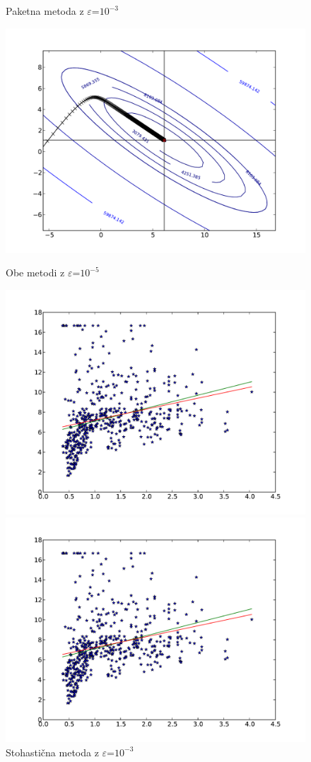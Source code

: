 \documentclass[a4paper,11pt]{article}
\begin{document}
\begin{figure}[h!]
\begin{minipage}[b]{0.5\linewidth}
\caption{Paketna metoda z $\varepsilon$=$10^{-3}$}
\includegraphics[scale=0.4]{b51.pdf}
\caption{Obe metodi z $\varepsilon$=$10^{-5}$}
\end{minipage}
\hspace{0.5cm}
\begin{minipage}[b]{0.5\linewidth}
\includegraphics[scale=0.4]{n32.pdf}
\caption{Stohastična metoda z $\varepsilon$=$10^{-3}$}
\includegraphics[scale=0.4]{b32.pdf}

\end{minipage}
\end{figure}
\end{document}
